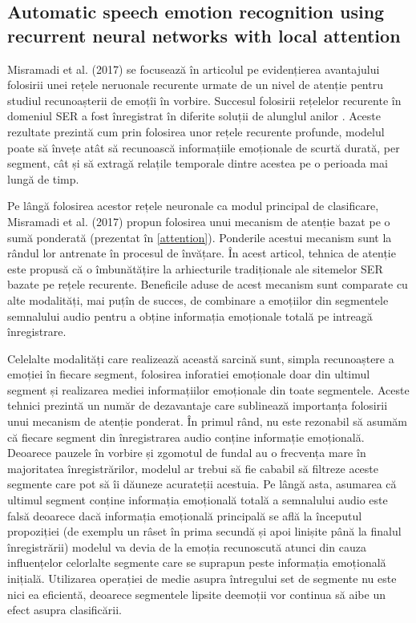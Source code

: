 \documentclass[a4paper,12pt]{book}
\begin{document}
					\subsection{Automatic speech emotion recognition using recurrent neural networks with local attention}
					 \label{prez_misramadi}
					 Misramadi et al. (2017) se focusează în articolul \cite{misramadi} pe evidențierea avantajului folosirii unei rețele neruonale recurente urmate de un nivel de atenție pentru studiul recunoașterii de emoțîi în vorbire. Succesul folosirii rețelelor recurente în domeniul SER a fost înregistrat în diferite soluții de alunglul anilor \cite{yuan,multi-domain,rnn1,rnn2}. Aceste rezultate prezintă cum prin folosirea unor rețele recurente profunde, modelul poate să învețe atât să recunoască informațiile emoționale de scurtă durată, per segment, cât și să extragă relațile temporale dintre acestea pe o perioada mai lungă de timp. \par
					 
					 \par 
					 Pe lângă folosirea acestor rețele neuronale ca modul principal de clasificare, Misramadi et al. (2017) propun folosirea unui mecanism de atenție bazat pe o sumă ponderată (prezentat în \ref{attention}). Ponderile acestui mecanism sunt la rândul lor antrenate în procesul de învățare. În acest articol, tehnica de atenție este propusă că o îmbunătățire la arhiecturile tradiționale ale sitemelor SER bazate pe rețele recurente. Beneficile aduse de acest mecanism sunt comparate cu alte modalități, mai puțîn de succes, de combinare a emoțiilor din segmentele semnalului audio pentru a obține informația emoționale totală pe intreagă înregistrare. \par
					 
					 Celelalte modalități care realizează această sarcină sunt, simpla recunoaștere a emoției în fiecare segment, folosirea inforatiei emoționale doar din ultimul segment și realizarea mediei informațiilor emoționale din toate segmentele. Aceste tehnici prezintă un număr de dezavantaje care sublinează importanța folosirii unui mecanism de atenție ponderat. În primul rând, nu este rezonabil să asumăm că fiecare segment din înregistrarea audio conține informație emoțională. Deoarece pauzele în vorbire și zgomotul de fundal au o frecvența mare în majoritatea înregistrărilor, modelul ar trebui să fie cababil să filtreze aceste segmente care pot să îi dăuneze acurateții acestuia. Pe lângă asta, asumarea că ultimul segment conține informația emoțională totală a semnalului audio este falsă deoarece dacă informația emoțională principală se află la începutul propoziției (de exemplu un râset în prima secundă și apoi linișite până la finalul înregistrării) modelul va devia de la emoția recunoscută atunci din cauza influențelor celorlalte segmente care se suprapun peste informația emoțională inițială. Utilizarea operației de medie asupra întregului set de segmente nu este nici ea eficientă, deoarece segmentele lipsite deemoții vor continua să aibe un efect asupra clasificării. \par
					 
\end{document}
